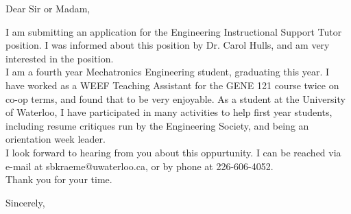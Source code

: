 \documentclass{letter}
\begin{document}
\begin{letter}{}
\opening{Dear Sir or Madam,}
I am submitting an application for the Engineering Instructional Support Tutor position. I was informed about this position by Dr. Carol Hulls, and am very interested in the position. \\

I am a fourth year Mechatronics Engineering student, graduating this year. I have worked as a WEEF Teaching Assistant for the GENE 121 course twice on co-op terms, and found that to be very enjoyable. As a student at the University of Waterloo, I have participated in many activities to help first year students, including resume critiques run by the Engineering Society, and being an orientation week leader. \\

I look forward to hearing from you about this oppurtunity. I can be reached via e-mail at sbkraeme@uwaterloo.ca, or by phone at 226-606-4052. \\

Thank you for your time.
\closing{Sincerely,}
\end{letter}
\end{document}
